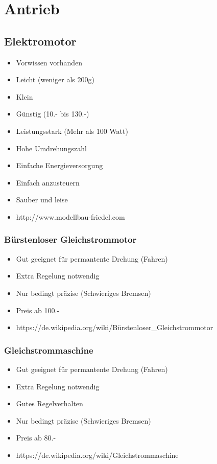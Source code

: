 \section{Antrieb}

\subsection{Elektromotor}
\begin{itemize}
\item Vorwissen vorhanden
\item Leicht (weniger als 200g)
\item Klein
\item Günstig (10.- bis 130.-)
\item Leistungsstark (Mehr als 100 Watt)
\item Hohe Umdrehungszahl
\item Einfache Energieversorgung
\item Einfach anzusteuern
\item Sauber und leise
\item http://www.modellbau-friedel.com
\end{itemize}

\subsubsection{Bürstenloser Gleichstrommotor}
\begin{itemize}
\item Gut geeignet für permantente Drehung (Fahren)
\item Extra Regelung notwendig
\item Nur bedingt präzise (Schwieriges Bremsen)
\item Preis ab 100.-
\item https://de.wikipedia.org/wiki/Bürstenloser\_Gleichstrommotor
\end{itemize}

\subsubsection{Gleichstrommaschine}
\begin{itemize}
\item Gut geeignet für permantente Drehung (Fahren)
\item Extra Regelung notwendig
\item Gutes Regelverhalten
\item Nur bedingt präzise (Schwieriges Bremsen)
\item Preis ab 80.-
\item https://de.wikipedia.org/wiki/Gleichstrommaschine
\end{itemize}

